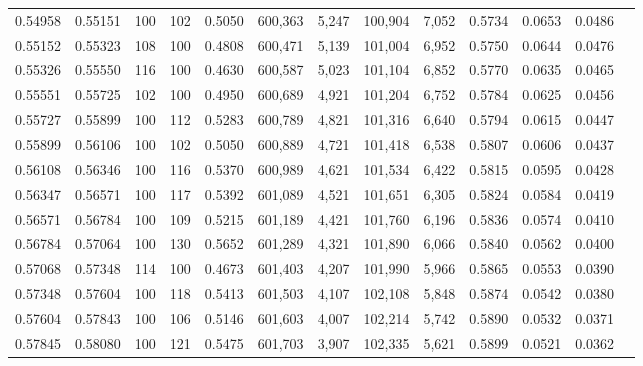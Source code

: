 \begin{tabular}{rrrrrrrrrrrrr}
0.54958 & 0.55151 &   100 & 102 &                                     0.5050 & 600,363 &   5,247 & 100,904 &   7,052 & 0.5734 & 0.0653 & 0.0486 \\
0.55152 & 0.55323 &   108 & 100 &                                     0.4808 & 600,471 &   5,139 & 101,004 &   6,952 & 0.5750 & 0.0644 & 0.0476 \\
0.55326 & 0.55550 &   116 & 100 &                                     0.4630 & 600,587 &   5,023 & 101,104 &   6,852 & 0.5770 & 0.0635 & 0.0465 \\
0.55551 & 0.55725 &   102 & 100 &                                     0.4950 & 600,689 &   4,921 & 101,204 &   6,752 & 0.5784 & 0.0625 & 0.0456 \\
0.55727 & 0.55899 &   100 & 112 &                                     0.5283 & 600,789 &   4,821 & 101,316 &   6,640 & 0.5794 & 0.0615 & 0.0447 \\
0.55899 & 0.56106 &   100 & 102 &                                     0.5050 & 600,889 &   4,721 & 101,418 &   6,538 & 0.5807 & 0.0606 & 0.0437 \\
0.56108 & 0.56346 &   100 & 116 &                                     0.5370 & 600,989 &   4,621 & 101,534 &   6,422 & 0.5815 & 0.0595 & 0.0428 \\
0.56347 & 0.56571 &   100 & 117 &                                     0.5392 & 601,089 &   4,521 & 101,651 &   6,305 & 0.5824 & 0.0584 & 0.0419 \\
0.56571 & 0.56784 &   100 & 109 &                                     0.5215 & 601,189 &   4,421 & 101,760 &   6,196 & 0.5836 & 0.0574 & 0.0410 \\
0.56784 & 0.57064 &   100 & 130 &                                     0.5652 & 601,289 &   4,321 & 101,890 &   6,066 & 0.5840 & 0.0562 & 0.0400 \\
0.57068 & 0.57348 &   114 & 100 &                                     0.4673 & 601,403 &   4,207 & 101,990 &   5,966 & 0.5865 & 0.0553 & 0.0390 \\
0.57348 & 0.57604 &   100 & 118 &                                     0.5413 & 601,503 &   4,107 & 102,108 &   5,848 & 0.5874 & 0.0542 & 0.0380 \\
0.57604 & 0.57843 &   100 & 106 &                                     0.5146 & 601,603 &   4,007 & 102,214 &   5,742 & 0.5890 & 0.0532 & 0.0371 \\
0.57845 & 0.58080 &   100 & 121 &                                     0.5475 & 601,703 &   3,907 & 102,335 &   5,621 & 0.5899 & 0.0521 & 0.0362 \\

\end{tabular}
